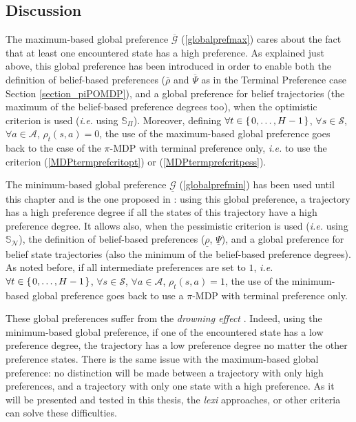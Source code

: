 \subsection{Discussion}
\label{subsection_discuss}
The maximum-based global preference $\overline{\mathcal{G}}$ (\ref{globalprefmax}) cares about 
the fact that at least one encountered state has a high preference.
As explained just above, 
this global preference has been introduced 
in order to enable both the definition of belief-based preferences 
($\overline{\rho}$ and $\overline{\Psi}$ 
as in the Terminal Preference case Section \ref{section_piPOMDP}),
and a global preference for belief trajectories 
(the maximum of the belief-based preference degrees too), 
when the optimistic criterion is used (\textit{i.e.} using $\mathbb{S}_{\Pi}$).
Moreover, defining $\forall t \in \left\{ \left. 0,\ldots,H-1 \right. \right\}$, $\forall s\in \mathcal{S}$, $\forall a\in\mathcal{A}$, $\rho_t(s,a) = 0$,
the use of the maximum-based global preference 
goes back to the case of the $\pi$-MDP with terminal preference only,
\textit{i.e.} to use the criterion (\ref{MDPtermprefcritopt})
or (\ref{MDPtermprefcritpess}).

The minimum-based global preference $\underline{\mathcal{G}}$ (\ref{globalprefmin}) 
has been used until this chapter
and is the one proposed in \cite{Sabbadin2001287,conf/ecai/Sabbadi00,Sabbadin:1999:pipomdp}: using this global preference,
a trajectory has a high preference degree 
if all the states of this trajectory have a high preference degree. 
It allows also, when the pessimistic criterion is used (\textit{i.e.} using $\mathbb{S}_{\mathcal{N}}$), the definition of belief-based preferences ($\underline{\rho}$, $\underline{\Psi}$),
and a global preference for belief state trajectories 
(also the minimum of the belief-based preference degrees).
As noted before, if all intermediate preferences are set to $1$,
\textit{i.e.} $\forall t \in \left\{ \left. 0,\ldots,H-1 \right. \right\}$, $\forall s\in \mathcal{S}$, $\forall a\in\mathcal{A}$, $\rho_t(s,a) = 1$,
the use of the minimum-based global preference 
goes back to use a $\pi$-MDP with terminal preference only.

These global preferences suffer from the \textit{drowning effect} \cite{didierhelene}.
Indeed, using the minimum-based global preference, 
if one of the encountered state has a low preference degree,
the trajectory has a low preference degree no matter the other preference states.
There is the same issue with the maximum-based global preference:
no distinction will be made between a trajectory 
with only high preferences, and a trajectory 
with only one state with a high preference.
As it will be presented and tested in this thesis, 
the \textit{lexi} approaches, or other criteria \cite{LIP61723}
can solve these difficulties. 



